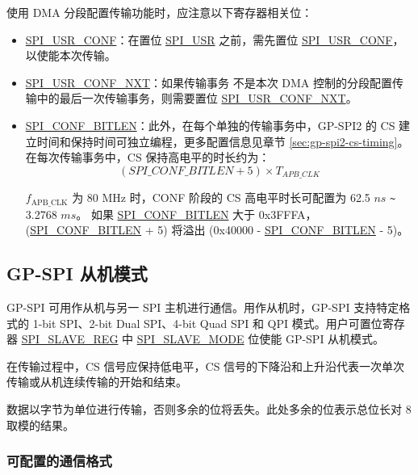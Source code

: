 \documentclass[main\_\_CN.tex]{subfiles}
\begin{document}
使用 DMA 分段配置传输功能时，应注意以下寄存器相关位：
\begin{itemize}
    \item \hyperref[fielddesc:SPIUSRCONF]{SPI\_USR\_CONF}：在置位  \hyperref[fielddesc:SPIUSR]{SPI\_USR} 之前，需先置位  \hyperref[fielddesc:SPIUSRCONF]{SPI\_USR\_CONF}，以使能本次传输。
    \item \hyperref[fielddesc:SPIUSRCONFNXT]{SPI\_USR\_CONF\_NXT}：如果传输事务  不是本次 DMA 控制的分段配置传输中的最后一次传输事务，则需要置位  \hyperref[fielddesc:SPIUSRCONFNXT]{SPI\_USR\_CONF\_NXT}。
    \item \hyperref[fielddesc:SPICONFBITLEN]{SPI\_CONF\_BITLEN}：此外，在每个单独的传输事务中，GP-SPI2 的 CS 建立时间和保持时间可独立编程，更多配置信息见章节  \ref{sec:gp-spi2-cs-timing}。在每次传输事务中，CS 保持高电平的时长约为：
    \[
    (\hyperref[fielddesc:SPICONFBITLEN]{SPI\_CONF\_BITLEN} + 5) \times T_{APB\_CLK}
    \]

$f_{\textrm{APB\_CLK}}$  为 80 MHz 时，CONF 阶段的 CS 高电平时长可配置为 62.5 $ns$ \verb+~+ 3.2768 $ms$。
如果  \hyperref[fielddesc:SPICONFBITLEN]{SPI\_CONF\_BITLEN} 大于 0x{}3FFFA，(\hyperref[fielddesc:SPICONFBITLEN]{SPI\_CONF\_BITLEN} + 5) 将溢出 (0x{}40000 - \hyperref[fielddesc:SPICONFBITLEN]{SPI\_CONF\_BITLEN} - 5)。
\end{itemize}

\subsection{GP-SPI 从机模式}\label{sec:gp-spi2-slave-mode}

GP-SPI 可用作从机与另一 SPI 主机进行通信。用作从机时，GP-SPI 支持特定格式的 1-bit SPI、2-bit Dual SPI、4-bit Quad SPI 和 QPI 模式。用户可置位寄存器  \hyperref[regdesc:SPISLAVEREG]{SPI\_SLAVE\_REG} 中  \hyperref[fielddesc:SPISLAVEMODE]{SPI\_SLAVE\_MODE} 位使能 GP-SPI 从机模式。

在传输过程中，CS 信号应保持低电平，CS 信号的下降沿和上升沿代表一次单次传输或从机连续传输的开始和结束。
\begin{tiplisting}
数据以字节为单位进行传输，否则多余的位将丢失。此处多余的位表示总位长对 8 取模的结果。
\end{tiplisting}

\subsubsection{可配置的通信格式}\label{slave communication format}
\end{document}
